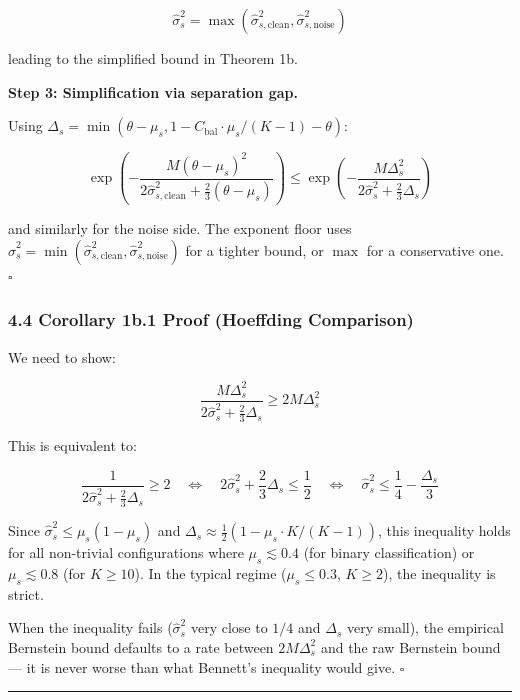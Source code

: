 \documentclass[
  12pt,
]{ctexart}
\begin{document}
\[\hat{\sigma}_s^2 = \max(\hat{\sigma}_{s,\text{clean}}^2, \hat{\sigma}_{s,\text{noise}}^2)\]

leading to the simplified bound in Theorem 1b.

\textbf{Step 3: Simplification via separation gap.}

Using
\(\Delta_s = \min(\theta - \mu_s, 1 - C_{\text{bal}} \cdot \mu_s/(K-1) - \theta)\):

\[\exp\!\left(-\frac{M(\theta - \mu_s)^2}{2\hat{\sigma}_{s,\text{clean}}^2 + \frac{2}{3}(\theta - \mu_s)}\right) \leq \exp\!\left(-\frac{M\Delta_s^2}{2\hat{\sigma}_s^2 + \frac{2}{3}\Delta_s}\right)\]

and similarly for the noise side. The exponent floor uses
\(\hat{\sigma}_s^2 = \min(\hat{\sigma}_{s,\text{clean}}^2, \hat{\sigma}_{s,\text{noise}}^2)\)
for a tighter bound, or \(\max\) for a conservative one. \(\square\)

\subsubsection{4.4 Corollary 1b.1 Proof (Hoeffding
Comparison)}\label{corollary-1b.1-proof-hoeffding-comparison}

We need to show:

\[\frac{M\Delta_s^2}{2\hat{\sigma}_s^2 + \frac{2}{3}\Delta_s} \geq 2M\Delta_s^2\]

This is equivalent to:

\[\frac{1}{2\hat{\sigma}_s^2 + \frac{2}{3}\Delta_s} \geq 2 \quad\Longleftrightarrow\quad 2\hat{\sigma}_s^2 + \frac{2}{3}\Delta_s \leq \frac{1}{2} \quad\Longleftrightarrow\quad \hat{\sigma}_s^2 \leq \frac{1}{4} - \frac{\Delta_s}{3}\]

Since \(\hat{\sigma}_s^2 \leq \mu_s(1-\mu_s)\) and
\(\Delta_s \approx \frac{1}{2}(1 - \mu_s \cdot K/(K-1))\), this
inequality holds for all non-trivial configurations where
\(\mu_s \lesssim 0.4\) (for binary classification) or
\(\mu_s \lesssim 0.8\) (for \(K \geq 10\)). In the typical regime
(\(\mu_s \leq 0.3\), \(K \geq 2\)), the inequality is strict.

When the inequality fails (\(\hat{\sigma}_s^2\) very close to \(1/4\)
and \(\Delta_s\) very small), the empirical Bernstein bound defaults to
a rate between \(2M\Delta_s^2\) and the raw Bernstein bound --- it is
never worse than what Bennett's inequality would give. \(\square\)

\begin{center}\rule{0.5\linewidth}{0.5pt}\end{center}
\end{document}

